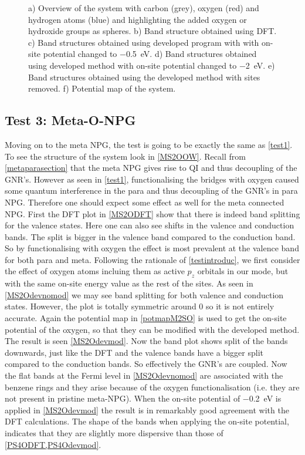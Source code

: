 \begin{figure}[H]
\begin{subfigure}[b]{0.8\textwidth}
		\vspace{-0.5\baselineskip}
		\caption{}
		\label{potmapPS4OH}
	\end{subfigure}
	\caption{a) Overview of the system with carbon (grey), oxygen (red) and hydrogen atoms (blue) and highlighting the added oxygen or hydroxide groups as spheres. b) Band structure obtained using DFT. c) Band structures obtained using developed program with with on-site potential changed to \SI{-0.5}{\electronvolt}. d) Band structures obtained using developed method with on-site potential changed to \SI{-2}{\electronvolt}. e) Band structures obtained using the developed method with sites removed. f) Potential map of the system.}
	\label{PS4OH}
\end{figure}
\subsection{Test 3: Meta-O-NPG}\label{test3}
Moving on to the meta NPG, the test is going to be exactly the same as \cref{test1}. To see the structure of the system look in \cref{MS2OOW}. Recall from \cref{metaparasection} that the meta NPG gives rise to QI and thus decoupling of the GNR's. However as seen in \cref{test1}, functionalising the bridges with oxygen caused some quantum interference in the para and thus decoupling of the GNR's in para NPG. Therefore one should expect some effect as well for the meta connected NPG. First the DFT plot in \cref{MS2ODFT} show that there is indeed band splitting for the valence states. Here one can also see shifts in the valence and conduction bands. The split is bigger in the valence band compared to the conduction band. So by functionalising with oxygen the effect is most prevalent at the valence band for both para and meta. Following the rationale of \cref{testintroduc}, we first consider the effect of oxygen atoms incluing them as active \(p_z\) orbitals in our mode, but with the same on-site energy value as the rest of the sites. As seen in \cref{MS2Odevnomod} we may see band splitting for both valence and conduction states. However, the plot is totally symmetric around 0 so it is not entirely accurate. Again the potential map in \cref{potmapM2SO} is used to get the on-site potential of the oxygen, so that they can be modified with the developed method. The result is seen \cref{MS2Odevmod}. Now the band plot shows split of the bands downwards, just like the DFT and the valence bands have a bigger split compared to the conduction bands. So effectively the GNR's are coupled. Now the flat bands  at the Fermi level in \cref{MS2Odevnomod} are associated with the benzene rings and they arise because of the oxygen functionalisation (i.e. they are not present in pristine meta-NPG). When the on-site potential of \SI{-0.2}{\electronvolt} is applied in \cref{MS2Odevmod} the result is in remarkably good agreement with the DFT calculations. The shape of the bands when applying the on-site potential, indicates that they are slightly more dispersive than those of \cref{PS4ODFT,PS4Odevmod}. 
